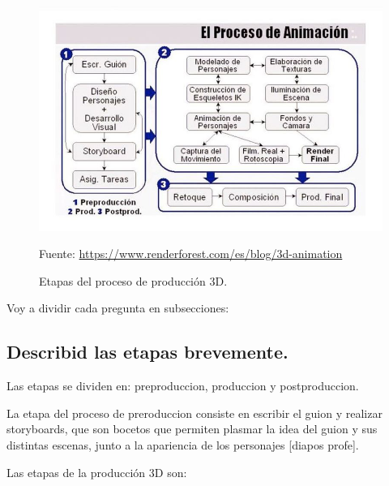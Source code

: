 \documentclass{article}
\begin{document}
\begin{figure}[H]
   \centering
   \includegraphics[width=\textwidth]{imagenes/prod.png}
   \caption{Etapas del proceso de producción 3D.}
   \vspace{10pt}
   \footnotesize{Fuente: \url{https://www.renderforest.com/es/blog/3d-animation}}
\end{figure}


Voy a dividir cada pregunta en subsecciones:

\subsection{Describid las etapas brevemente.}
Las etapas se dividen en: preproduccion, produccion y postproduccion.


La etapa del proceso de preroduccion consiste en escribir el guion y realizar storyboards, que son bocetos que permiten plasmar la idea del guion y sus distintas escenas, junto a la apariencia de los personajes [diapos profe].

Las etapas de la producción 3D son:
\end{document}
